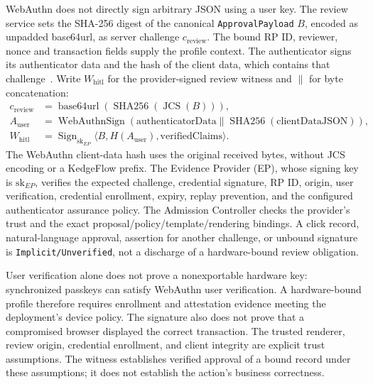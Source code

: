 WebAuthn does not directly sign arbitrary JSON using a user key. The review service sets the SHA-256 digest of the canonical \texttt{ApprovalPayload} $B$, encoded as unpadded base64url, as server challenge $c_{\mathrm{review}}$. The bound RP ID, reviewer, nonce and transaction fields supply the profile context. The authenticator signs its authenticator data and the hash of the client data, which contains that challenge~\cite{webauthn3}. Write $W_{\mathrm{hitl}}$ for the provider-signed review witness and $\parallel$ for byte concatenation:
\begin{equation}
\begin{split}
c_{\mathrm{review}}&=\operatorname{base64url}(\operatorname{SHA256}(\operatorname{JCS}(B))),\\
A_{\mathrm{user}}&=\operatorname{WebAuthnSign}
(\mathrm{authenticatorData}\parallel \operatorname{SHA256}(\mathrm{clientDataJSON})),\\
W_{\mathrm{hitl}}&=\operatorname{Sign}_{\mathrm{sk}_{EP}}
\langle B,H(A_{\mathrm{user}}),\mathrm{verifiedClaims}\rangle .
\end{split}
\end{equation}
The WebAuthn client-data hash uses the original received bytes, without JCS encoding or a KedgeFlow prefix. The Evidence Provider (EP), whose signing key is $\mathrm{sk}_{EP}$, verifies the expected challenge, credential signature, RP ID, origin, user verification, credential enrollment, expiry, replay prevention, and the configured authenticator assurance policy. The Admission Controller checks the provider's trust and the exact proposal/policy/template/rendering bindings. A click record, natural-language approval, assertion for another challenge, or unbound signature is \texttt{Implicit/Unverified}, not a discharge of a hardware-bound review obligation.

User verification alone does not prove a nonexportable hardware key: synchronized passkeys can satisfy WebAuthn user verification. A hardware-bound profile therefore requires enrollment and attestation evidence meeting the deployment's device policy. The signature also does not prove that a compromised browser displayed the correct transaction. The trusted renderer, review origin, credential enrollment, and client integrity are explicit trust assumptions. The witness establishes verified approval of a bound record under these assumptions; it does not establish the action's business correctness.

